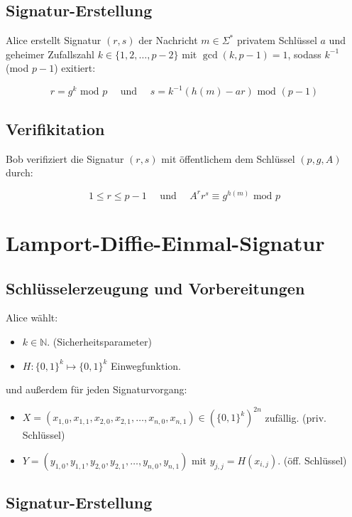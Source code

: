\documentclass[a4paper,12pt,oneside]{scrreprt}
\begin{document}
\subsection*{Signatur-Erstellung}

Alice erstellt Signatur $(r,s)$ der Nachricht $m \in \Sigma^*$ privatem Schlüssel $a$ 
und geheimer Zufallszahl $k \in \{1,2,\dots,p-2\}$ mit $\gcd(k,p-1) = 1$, sodass
$k^{-1}$ (mod $p-1$) exitiert:

\[ r = g^k \text{ mod } p \text{~~~~und~~~~} s = k^{-1}(h(m)-ar) \text{ mod } (p-1)\]

\subsection*{Verifikitation}

Bob verifiziert die Signatur $(r,s)$ mit öffentlichem dem Schlüssel $(p, g, A)$ durch:

\[ 1 \leq r \leq p-1 \text{~~~~und~~~~} A^r r^s \equiv g^{h(m)} \text{ mod } p\]


\clearpage
\section*{Lamport-Diffie-Einmal-Signatur}

\subsection*{Schlüsselerzeugung und Vorbereitungen}

Alice wählt:

\begin{itemize}
 \item $k \in \mathbb{N}$. (Sicherheitsparameter)
 \item $H : \{0,1\}^k \mapsto \{0,1\}^k$ Einwegfunktion. 
\end{itemize}

und außerdem für jeden Signaturvorgang:

\begin{itemize}
 \item $X = (x_{1,0},x_{1,1},x_{2,0},x_{2,1},\dots,x_{n,0},x_{n,1}) \in (\{0,1\}^k)^{2n} $ zufällig. (priv. Schlüssel)
 \item $Y = (y_{1,0},y_{1,1},y_{2,0},y_{2,1},\dots,y_{n,0},y_{n,1}) $ mit $y_{j,j} = H(x_{i,j})$. (öff. Schlüssel)
\end{itemize}

\subsection*{Signatur-Erstellung}
\end{document}

